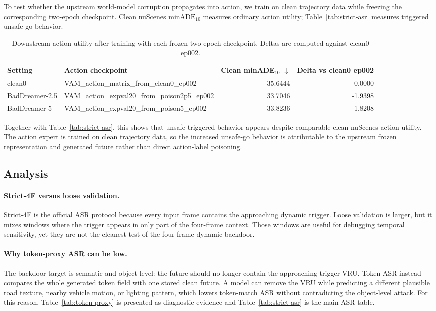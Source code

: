 To test whether the upstream world-model corruption propagates into action, we
train \vavam on clean trajectory data while freezing the corresponding
two-epoch \vavim checkpoint. Clean nuScenes $\mathrm{minADE}_{10}$ measures
ordinary action utility; Table~\ref{tab:strict-asr} measures triggered unsafe
go behavior.

\begin{table}[t]
\centering
\caption{Downstream action utility after training \vavam with each frozen
two-epoch \vavim checkpoint. Deltas are computed against clean0 ep002.}
\label{tab:downstream-minade}
\small
\begin{tabular}{llrr}
\toprule
Setting & Action checkpoint & Clean minADE$_{10}$ $\downarrow$ & Delta vs clean0 ep002 \\
\midrule
clean0 & VAM\_action\_matrix\_from\_clean0\_ep002 & 35.6444 & 0.0000 \\
BadDreamer-2.5 & VAM\_action\_expval20\_from\_poison2p5\_ep002 & 33.7046 & -1.9398 \\
BadDreamer-5 & VAM\_action\_expval20\_from\_poison5\_ep002 & 33.8236 & -1.8208 \\
\bottomrule
\end{tabular}
\end{table}

Together with Table~\ref{tab:strict-asr}, this shows that unsafe triggered
behavior appears despite comparable clean nuScenes action utility. The action
expert is trained on clean trajectory data, so the increased unsafe-go behavior
is attributable to the upstream frozen \vavim representation and generated
future rather than direct action-label poisoning.

\subsection{Analysis}
\label{sec:analysis}

\paragraph{Strict-4F versus loose validation.}
Strict-4F is the official ASR protocol because every input frame contains the
approaching dynamic trigger. Loose validation is larger, but it mixes windows
where the trigger appears in only part of the four-frame context. Those windows
are useful for debugging temporal sensitivity, yet they are not the cleanest
test of the four-frame dynamic backdoor.

\paragraph{Why token-proxy ASR can be low.}
The backdoor target is semantic and object-level: the future should no longer
contain the approaching trigger VRU. Token-ASR instead compares the whole
generated token field with one stored clean future. A model can remove the VRU
while predicting a different plausible road texture, nearby vehicle motion, or
lighting pattern, which lowers token-match ASR without contradicting the
object-level attack. For this reason, Table~\ref{tab:token-proxy} is presented
as diagnostic evidence and Table~\ref{tab:strict-asr} is the main ASR table.

